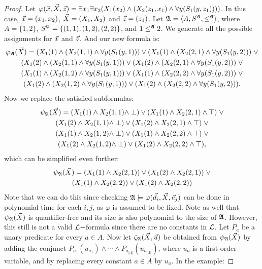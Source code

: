 \begin{proof}
Let $\varphi(\vec{x},\vec{X},\vec{z}) = \exists x_1\exists x_2( X_1(x_2) \wedge ( X_2(z_1,x_1) \wedge \forall y( S_1(y,z_1) )  ))$. In this case, $\vec{x} = (x_1,x_2)$, $\vec{X} = (X_1,X_2)$ and $\vec{z} = (z_1)$. Let ${\frak A} = \langle A,S^{\frak A},\leq^{\frak A} \rangle$, where $A = \{1,2\}$, $S^{\frak A} = \{(1,1),(1,2),(2,2)\}$, and $1 \leq^{\frak A} 2$. We generate all the possible assignments for $\vec{x}$ and $\vec{z}$. And our new formula is:
\begin{multline*}
\varphi_{\frak A}(\vec{X}) = (X_1(1) \wedge ( X_2(1,1) \wedge \forall y( S_1(y,1) )  ) \vee (X_1(1) \wedge ( X_2(2,1) \wedge \forall y( S_1(y,2) )  )\; \vee \\
(X_1(2) \wedge ( X_2(1,1) \wedge \forall y( S_1(y,1) )  ) \vee (X_1(2) \wedge ( X_2(2,1) \wedge \forall y( S_1(y,2) )  )\; \vee \\
(X_1(1) \wedge ( X_2(1,2) \wedge \forall y( S_1(y,1) )  ) \vee (X_1(1) \wedge ( X_2(2,2) \wedge \forall y( S_1(y,2) )  )\; \vee \\
(X_1(2) \wedge ( X_2(1,2) \wedge \forall y( S_1(y,1) )  ) \vee (X_1(2) \wedge ( X_2(2,2) \wedge \forall y( S_1(y,2) )  ).
\end{multline*}
Now we replace the satisfied subformulas:
\begin{multline*}
\psi_{\frak A}(\vec{X}) = (X_1(1) \wedge X_2(1,1) \wedge \perp  ) \vee (X_1(1) \wedge  X_2(2,1) \wedge \top  ) \;\vee \\
(X_1(2) \wedge  X_2(1,1) \wedge \perp  ) \vee (X_1(2) \wedge  X_2(2,1) \wedge \top  ) \;\vee \\
(X_1(1) \wedge  X_2(1,2) \wedge \perp  ) \vee (X_1(1) \wedge  X_2(2,2) \wedge \top  ) \;\vee \\
(X_1(2) \wedge  X_2(1,2) \wedge \perp  ) \vee (X_1(2) \wedge  X_2(2,2) \wedge \top  ),
\end{multline*}
which can be simplified even further:
\begin{multline*}
\psi_{\frak A}(\vec{X}) = (X_1(1) \wedge X_2(2,1)  ) \vee (X_1(2) \wedge  X_2(2,1) ) \;\vee \\ 
(X_1(1) \wedge  X_2(2,2)  ) \vee (X_1(2) \wedge  X_2(2,2)  )
\end{multline*}
Note that we can do this since checking ${\frak A}\models\varphi(\vec{d}_i,\vec{X},\vec{e}_j)$ can be done in polynomial time for each $i,j$, as $\varphi$ is assumed to be fixed. Note as well that $\psi_{\frak A}(\vec{X})$ is quantifier-free and its size is also polynomial to the size of ${\frak A}$. However, this still is not a valid ${\cal L}-$formula since there are no constants in ${\cal L}$. Let $P_a$ be a unary predicate for every $a\in A$. Now let $\zeta_{\frak A}(\vec{X},\vec{u})$ be obtained from $\psi_{\frak A}(\vec{X})$ by adding the conjunct $P_{a_1}(u_{a_1}) \wedge \cdots \wedge P_{a_{\vert A \vert}}(u_{a_{\vert A \vert}})$, where $u_a$ is a first order variable, and by replacing every constant $a\in A$ by $u_a$. In the example:

\end{proof}
